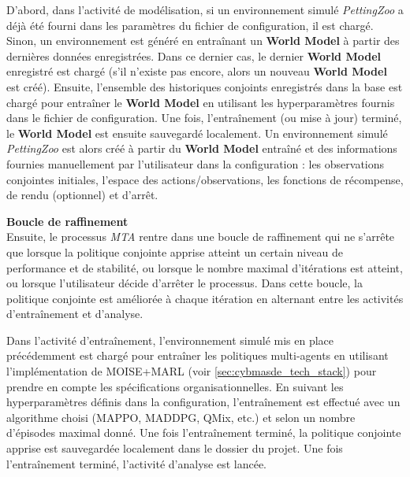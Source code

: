 D'abord, dans l'activité de modélisation, si un environnement simulé \textit{PettingZoo} a déjà été fourni dans les paramètres du fichier de configuration, il est chargé. Sinon, un environnement est généré en entraînant un \textbf{World Model} à partir des dernières données enregistrées. Dans ce dernier cas, le dernier \textbf{World Model} enregistré est chargé (s'il n'existe pas encore, alors un nouveau \textbf{World Model} est créé). Ensuite, l'ensemble des historiques conjoints enregistrés dans la base est chargé pour entraîner le \textbf{World Model} en utilisant les hyperparamètres fournis dans le fichier de configuration. Une fois, l'entraînement (ou mise à jour) terminé, le \textbf{World Model} est ensuite sauvegardé localement. Un environnement simulé \textit{PettingZoo} est alors créé à partir du \textbf{World Model} entraîné et des informations fournies manuellement par l'utilisateur dans la configuration : les observations conjointes initiales, l'espace des actions/observations, les fonctions de récompense, de rendu (optionnel) et d'arrêt.

\noindent \textbf{Boucle de raffinement} \\

Ensuite, le processus \textit{MTA} rentre dans une boucle de raffinement qui ne s'arrête que lorsque la politique conjointe apprise atteint un certain niveau de performance et de stabilité, ou lorsque le nombre maximal d'itérations est atteint, ou lorsque l'utilisateur décide d'arrêter le processus. Dans cette boucle, la politique conjointe est améliorée à chaque itération en alternant entre les activités d'entraînement et d'analyse.

Dans l'activité d'entraînement, l'environnement simulé mis en place précédemment est chargé pour entraîner les politiques multi-agents en utilisant l'implémentation de MOISE+MARL (voir \autoref{sec:cybmasde_tech_stack}) pour prendre en compte les spécifications organisationnelles. En suivant les hyperparamètres définis dans la configuration, l'entraînement est effectué avec un algorithme choisi (MAPPO, MADDPG, QMix, etc.) et selon un nombre d'épisodes maximal donné. Une fois l'entraînement terminé, la politique conjointe apprise est sauvegardée localement dans le dossier du projet. Une fois l'entraînement terminé, l'activité d'analyse est lancée.

